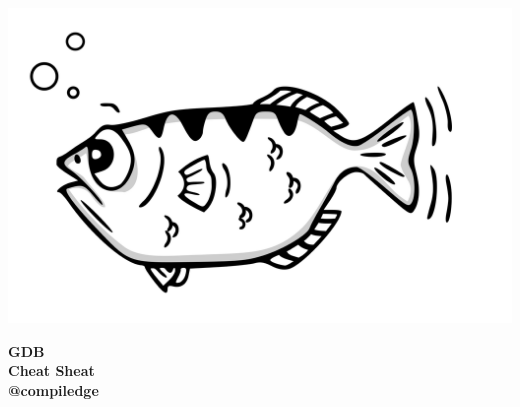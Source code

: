 \documentclass[10pt,landscape,a4paper]{cheatsheet}
\begin{document}
\sffamily
\small
\begin{multicols*}{5}

\includegraphics[scale=0.04]{img/gdb.png}
\vspace{-1.5cm}
\begin{flushright} \bf
GDB \\ Cheat Sheat \\ @compiledge
\end{flushright}
\vspace{-0.25cm}

\end{multicols*}
\end{document}

